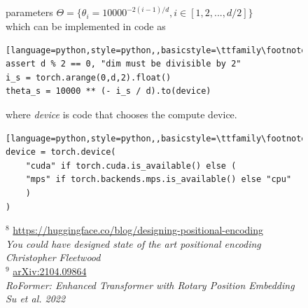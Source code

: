 \documentclass[12pt]{article}
\begin{document}
\begin{figure}[!htb]
\begin{minipage}[t]{0.65\textwidth}
    parameters $\Theta=\{\theta_i=10000^{-2(i-1)/d}, i\in[1,2,...,d/2]\}$\\
    which can be implemented in code as 
\begin{lstlisting}[language=python,style=python,,basicstyle=\ttfamily\footnotesize]
assert d % 2 == 0, "dim must be divisible by 2"
i_s = torch.arange(0,d,2).float()
theta_s = 10000 ** (- i_s / d).to(device)
\end{lstlisting}
where {\it device} is code that chooses the compute device.
\begin{lstlisting}[language=python,style=python,,basicstyle=\ttfamily\footnotesize]
device = torch.device(
    "cuda" if torch.cuda.is_available() else (
    "mps" if torch.backends.mps.is_available() else "cpu"
    )
)    
\end{lstlisting}
   \end{minipage}%
    \hspace{25pt}
    \begin{minipage}[t]{.4\textwidth}
      \raggedright
      \scriptsize 
      $^8$ \tiny{\url{https://huggingface.co/blog/designing-positional-encoding}}\\
      \scriptsize 
      { \it You could have designed state of the art positional encoding}\\
      {\it Christopher Fleetwood}\\
      \vspace{2em}
      $^9$ 	\href{https://arxiv.org/pdf/2104.09864}{arXiv:2104.09864}\\
      {\it RoFormer: Enhanced Transformer with Rotary Position Embedding}\\
      {\it Su et al. 2022}\\
      \vspace{2em}
    \end{minipage}
\end{figure}
\pagebreak
\end{document}
